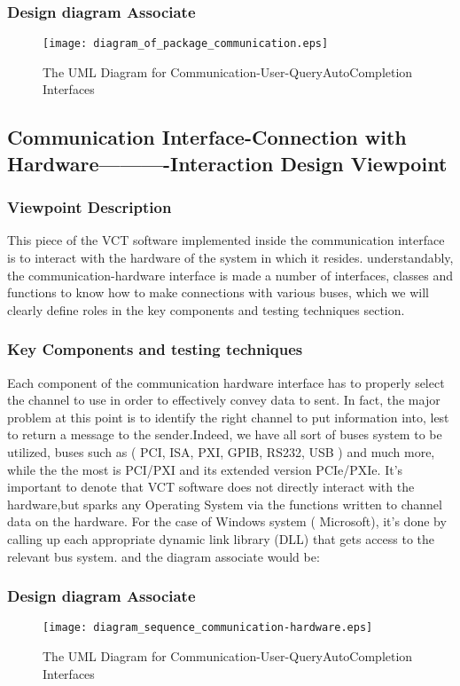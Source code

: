 \documentclass [10pt]{article}
\begin{document}
\subsubsection{Design  diagram Associate}
\begin{figure}[ht]
\centering
\texttt{[image: diagram\_of\_package\_communication.eps]}
\caption{The UML Diagram for Communication-User-QueryAutoCompletion Interfaces}
\end{figure}

\pagebreak

\subsection{\textbf{Communication Interface-Connection with Hardware----------Interaction Design Viewpoint }}

\subsubsection{Viewpoint Description}
This piece of the VCT software implemented inside the communication interface is to interact with the hardware of the system in which it resides. understandably, the communication-hardware interface is made a number of interfaces, classes and functions to know how to make connections with various buses, which we will clearly define roles in the key components and testing techniques section.
\subsubsection{Key Components and testing techniques}
Each component of the communication hardware interface has to properly select the channel to use in order to effectively convey data to sent. In fact, the major problem at this point is to identify the right channel to put information into, lest to return a message to the sender.Indeed, we have all sort of buses system to be utilized, buses such as  ( PCI, ISA, PXI, GPIB, RS232, USB ) and much more, while the the most is PCI/PXI and its extended version PCIe/PXIe. It's important to denote that VCT software does not  directly interact  with the hardware,but sparks any Operating System via the functions written to channel data on the hardware. For the case of Windows system ( Microsoft), it's done by calling up each appropriate dynamic link library (DLL) that gets access to the relevant bus system. and the diagram associate would be:

\subsubsection{ Design  diagram Associate}

\begin{figure}[ht]
\centering
\texttt{[image: diagram\_sequence\_communication-hardware.eps]}
\caption{The UML Diagram for Communication-User-QueryAutoCompletion Interfaces}
\end{figure}
\end{document}
